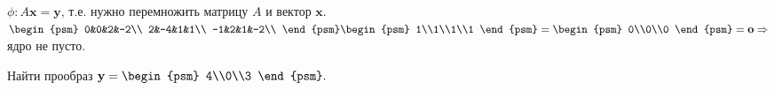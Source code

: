 $\phi: A\textbf{x}=\textbf{y}$, т.е. нужно перемножить матрицу $A$ и вектор $\textbf{x}$.\\
$
\begin{psm}
0&0&2&-2\\
2&-4&1&1\\
-1&2&1&-2\\
\end{psm}
\begin{psm}
1\\1\\1\\1
\end{psm}
=
\begin{psm}
0\\0\\0
\end{psm}
=\textbf{o}
\Rightarrow$ ядро не пусто.
\begin{prim}
	Найти прообраз $\textbf{y}=\begin{psm}
	4\\0\\3
	\end{psm}.$
\end{prim}\\

